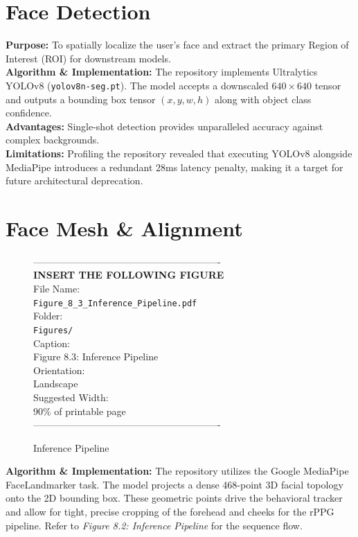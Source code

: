 \section{Face Detection}
\textbf{Purpose:} To spatially localize the user's face and extract the primary Region of Interest (ROI) for downstream models. \\
\textbf{Algorithm \& Implementation:} The repository implements Ultralytics YOLOv8 (\texttt{yolov8n-seg.pt}). The model accepts a downscaled $640 \times 640$ tensor and outputs a bounding box tensor $(x, y, w, h)$ along with object class confidence. \\
\textbf{Advantages:} Single-shot detection provides unparalleled accuracy against complex backgrounds. \\
\textbf{Limitations:} Profiling the repository revealed that executing YOLOv8 alongside MediaPipe introduces a redundant 28ms latency penalty, making it a target for future architectural deprecation.

\section{Face Mesh \& Alignment}
\begin{figure}[htbp]
\begin{center}
----------------------------------------------------------\\
\vspace{0.5em}
\textbf{INSERT THE FOLLOWING FIGURE}\\
\vspace{1em}
File Name:\\
\texttt{Figure\_8\_3\_Inference\_Pipeline.pdf}\\
\vspace{1em}
Folder:\\
\texttt{Figures/}\\
\vspace{1em}
Caption:\\
Figure 8.3: Inference Pipeline\\
\vspace{1em}
Orientation:\\
Landscape\\
\vspace{1em}
Suggested Width:\\
90\% of printable page\\
\vspace{3cm}
----------------------------------------------------------
\end{center}
\caption{Inference Pipeline}
\label{fig:diag_5}
\end{figure}
\textbf{Algorithm \& Implementation:} The repository utilizes the Google MediaPipe FaceLandmarker task. The model projects a dense 468-point 3D facial topology onto the 2D bounding box. These geometric points drive the behavioral tracker and allow for tight, precise cropping of the forehead and cheeks for the rPPG pipeline. Refer to \textit{Figure 8.2: Inference Pipeline} for the sequence flow.

